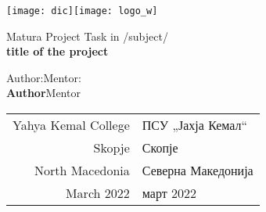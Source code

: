 \begin{titlepage}
	\begin{center}
	
		\texttt{[image: dic]}\hfill\texttt{[image: logo\_w]}
	    
    	\vfill
		
		\Large
		Matura Project Task in /subject/\\
		\vspace{0.5cm}
		\Huge
		\textbf{title of the project}\\
		
		
		\vfill
		
		\normalsize
		Author:\hfill Mentor:\\
		\large
		\textbf{Author}\hfill Mentor
		
		\vspace{2cm}
		
		\normalsize
		\begin{tabular}{ r | l }
            Yahya Kemal College & ПСУ „Јахја Кемал“\\
            Skopje & Скопје\\
            North Macedonia & Северна Македонија\\
            March 2022 & март 2022
        \end{tabular}
            
	\end{center}
\end{titlepage}
